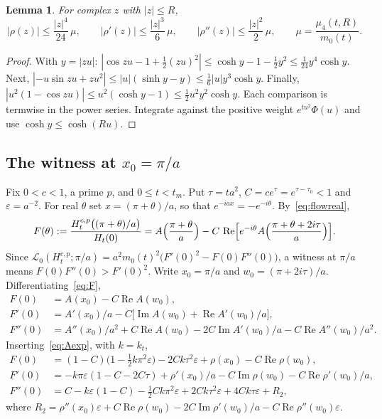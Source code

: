\documentclass[11pt]{article}
\numberwithin{equation}{section}
\newtheorem{lemma}[theorem]{Lemma}
\theoremstyle{definition}
\theoremstyle{remark}
\DeclareMathOperator{\Rea}{Re}
\DeclareMathOperator{\Ima}{Im}
\newcommand{\Lag}{\mathscr L_0}
\begin{document}
\begin{lemma}\label{lem:remainder}
For complex $z$ with $|z|\le R$,
\[
|\rho(z)|\le\frac{|z|^4}{24}\,\mu,\qquad
|\rho'(z)|\le\frac{|z|^3}{6}\,\mu,\qquad
|\rho''(z)|\le\frac{|z|^2}{2}\,\mu,\qquad
\mu=\frac{\mu_4(t,R)}{m_0(t)} .
\]
\end{lemma}

\begin{proof}
With $y=|zu|$: $|\cos zu-1+\tfrac12(zu)^2|\le\cosh y-1-\tfrac12y^2\le
\tfrac1{24}y^4\cosh y$. Next, $|{-u}\sin zu+zu^2|\le|u|(\sinh y-y)\le
\tfrac16|u|y^3\cosh y$. Finally, $|u^2(1-\cos zu)|\le u^2(\cosh y-1)\le
\tfrac12u^2y^2\cosh y$. Each comparison is termwise in the power series.
Integrate against the positive weight $e^{tu^2}\Phi(u)$ and use
$\cosh y\le\cosh(Ru)$.
\end{proof}

\subsection{The witness at \texorpdfstring{$x_0=\pi/a$}{x0 = pi/a}}
Fix $0<c<1$, a prime $p$, and $0\le t<t_m$. Put $\tau=ta^2$, $C=ce^\tau
=e^{\tau-\tau_0}<1$ and $\varepsilon=a^{-2}$. For real $\theta$ set
$x=(\pi+\theta)/a$, so that $e^{-iax}=-e^{-i\theta}$. By~\eqref{eq:flowreal},
\begin{equation}\label{eq:F}
F(\theta):=\frac{H^{c,p}_t\bigl((\pi+\theta)/a\bigr)}{H_t(0)}
=A\Bigl(\frac{\pi+\theta}a\Bigr)
-C\,\Rea\Bigl[e^{-i\theta}A\Bigl(\frac{\pi+\theta+2i\tau}a\Bigr)\Bigr].
\end{equation}
Since $\Lag(H^{c,p}_t;\pi/a)=a^2m_0(t)^2\bigl(F'(0)^2-F(0)F''(0)\bigr)$,
a witness at $\pi/a$ means $F(0)F''(0)>F'(0)^2$. Write $x_0=\pi/a$ and
$w_0=(\pi+2i\tau)/a$. Differentiating~\eqref{eq:F},
\begin{align*}
F(0)&=A(x_0)-C\Rea A(w_0),\\
F'(0)&=A'(x_0)/a-C\bigl[\Ima A(w_0)+\Rea A'(w_0)/a\bigr],\\
F''(0)&=A''(x_0)/a^2+C\Rea A(w_0)-2C\Ima A'(w_0)/a-C\Rea A''(w_0)/a^2 .
\end{align*}
Inserting~\eqref{eq:Aexp}, with $k=k_t$,
\begin{align}
F(0)&=(1-C)\bigl(1-\tfrac12k\pi^2\varepsilon\bigr)-2Ck\tau^2\varepsilon
+\rho(x_0)-C\Rea\rho(w_0),\label{eq:F0}\\
F'(0)&=-k\pi\varepsilon(1-C-2C\tau)+\rho'(x_0)/a-C\Ima\rho(w_0)
-C\Rea\rho'(w_0)/a,\label{eq:F1}\\
F''(0)&=C-k\varepsilon(1-C)-\tfrac12Ck\pi^2\varepsilon
+2Ck\tau^2\varepsilon+4Ck\tau\varepsilon+R_2,\label{eq:F2}
\end{align}
where
$R_2=\rho''(x_0)\varepsilon+C\Rea\rho(w_0)-2C\Ima\rho'(w_0)/a
-C\Rea\rho''(w_0)\varepsilon$.
\end{document}
